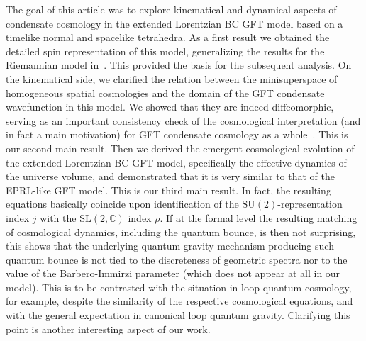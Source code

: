 \documentclass[11pt,a4paper]{article}
\newcommand{\C}{\mathbb C}
\newcommand{\SU}{\text{SU$(2)$}}
\newcommand{\SL}{\text{SL$(2,\C)$}}
\begin{document}
The goal of this article was to explore kinematical and dynamical aspects of condensate cosmology in the extended Lorentzian BC GFT model based on a timelike normal and spacelike tetrahedra. As a first result we obtained the detailed spin representation of this model, generalizing the results for the Riemannian model in~\cite{Baratin:2011tx}. This provided the basis for the subsequent analysis. On the kinematical side, we clarified the relation between the minisuperspace of homogeneous spatial cosmologies and the domain of the GFT condensate wavefunction in this model. We showed that they are indeed diffeomorphic, serving as an important consistency check of the cosmological interpretation (and in fact a main motivation) for GFT condensate cosmology as a whole~\cite{Gielen:2014ila,deCesare:2017ynn}. This is our second main result.  
Then we derived the emergent cosmological evolution of the extended Lorentzian BC GFT model, specifically the effective dynamics of the universe volume, and demonstrated that it is very similar to that of the EPRL-like GFT model. This is our third main result. 
In fact, the resulting equations basically coincide upon identification of the $\SU$-representation index $j$ with the $\SL$ index $\rho$. If at the formal level the resulting matching of cosmological dynamics, including the quantum bounce, is then not surprising, this shows that the underlying quantum gravity mechanism producing such quantum bounce is not tied to the discreteness of geometric spectra nor to the value of the Barbero-Immirzi parameter (which does not appear at all in our model). This is to be contrasted with the situation in loop quantum cosmology, for example, despite the similarity of the respective cosmological equations, and with the general expectation in canonical loop quantum gravity. Clarifying this point is another interesting aspect of our work.
\newline
\end{document}
